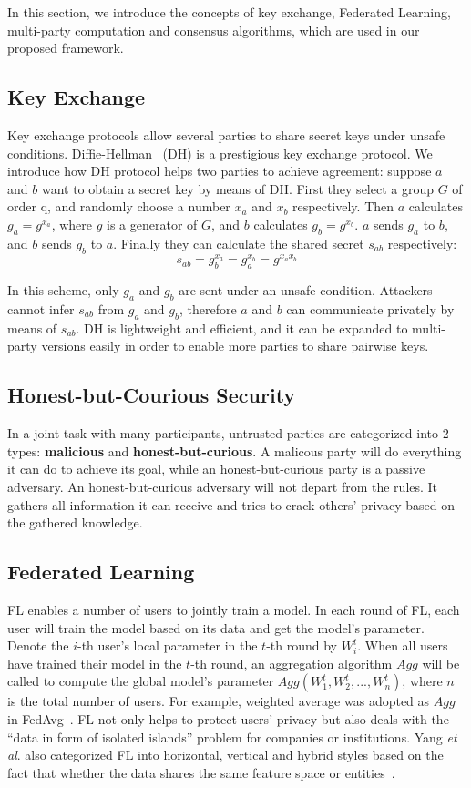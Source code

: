 In this section, we introduce the concepts of key exchange, Federated Learning, multi-party computation and consensus algorithms, which are used in our proposed framework.

\subsection{Key Exchange}
Key exchange protocols allow several parties to share secret keys under unsafe conditions. Diffie-Hellman~\cite{DH} (DH) is a prestigious key exchange protocol. We introduce how DH protocol helps two parties to achieve agreement: suppose $a$ and $b$ want to obtain a secret key by means of DH. First they select a group $G$ of order q, and randomly choose a number $x_a$ and $x_b$ respectively. Then $a$ calculates $g_a = g^{x_a}$, where $g$ is a generator of $G$, and $b$ calculates $g_b = g^{x_b}$. $a$ sends $g_a$ to $b$, and $b$ sends $g_b$ to $a$. Finally they can calculate the shared secret $s_{ab}$ respectively:
$$ s_{ab} = g_b^{x_a}  = g_a^{x_b} = g^{x_ax_b}$$

In this scheme, only $g_a$ and $g_b$ are sent under an unsafe condition. Attackers cannot infer $s_{ab}$ from $g_a$ and $g_b$, therefore $a$ and $b$ can communicate privately by means of $s_{ab}$. DH is lightweight and efficient, and it can be expanded to multi-party versions easily in order to enable more parties to share pairwise keys.

\subsection{Honest-but-Courious Security}
In a joint task with many participants, untrusted parties are categorized into 2 types: \textbf{malicious} and \textbf{honest-but-curious}. A malicous party will do everything it can do to achieve its goal, while an honest-but-curious party is a passive adversary. An honest-but-curious adversary will not depart from the rules. It gathers all information it can receive and tries to crack others' privacy based on the gathered knowledge.

\subsection{Federated Learning}
FL enables a number of users to jointly train a model. In each round of FL, each user will train the model based on its data and get the model's parameter. Denote the $i$-th user's local parameter in the $t$-th round by $W_i^t$. When all users have trained their model in the $t$-th round, an aggregation algorithm $Agg$ will be called to compute the global model's parameter $Agg(W_1^t, W_2^t, ..., W_n^t)$, where $n$ is the total number of users. For example, weighted average was adopted as $Agg$ in FedAvg~\cite{mcmahan2016communicationefficient}. FL not only helps to protect users' privacy but also deals with the ``data in form of isolated islands'' problem for companies or institutions. Yang \emph{et al}. also categorized FL into horizontal, vertical and hybrid styles based on the fact that whether the data shares the same feature space or entities~\cite{yang2019federated}. 


